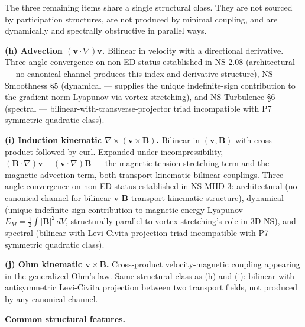 \documentclass[
  11pt,a4paper]{article}
\begin{document}
The three remaining items share a single structural class. They are not
sourced by participation structures, are not produced by minimal
coupling, and are dynamically and spectrally obstructive in parallel
ways.

\textbf{(h) Advection \((\mathbf{v}\cdot\nabla)\mathbf{v}\).} Bilinear
in velocity with a directional derivative. Three-angle convergence on
non-ED status established in NS-2.08 (architectural --- no canonical
channel produces this index-and-derivative structure), NS-Smoothness §5
(dynamical --- supplies the unique indefinite-sign contribution to the
gradient-norm Lyapunov via vortex-stretching), and NS-Turbulence §6
(spectral --- bilinear-with-transverse-projector triad incompatible with
P7 symmetric quadratic class).

\textbf{(i) Induction kinematic
\(\nabla\times(\mathbf{v}\times\mathbf{B})\).} Bilinear in
\((\mathbf{v},\mathbf{B})\) with cross-product followed by curl.
Expanded under incompressibility,
\((\mathbf{B}\cdot\nabla)\mathbf{v} - (\mathbf{v}\cdot\nabla)\mathbf{B}\)
--- the magnetic-tension stretching term and the magnetic advection
term, both transport-kinematic bilinear couplings. Three-angle
convergence on non-ED status established in NS-MHD-3: architectural (no
canonical channel for bilinear \(\mathbf{v}\)-\(\mathbf{B}\)
transport-kinematic structure), dynamical (unique indefinite-sign
contribution to magnetic-energy Lyapunov
\(E_M = \tfrac{1}{2}\int|\mathbf{B}|^2\,dV\), structurally parallel to
vortex-stretching's role in 3D NS), and spectral
(bilinear-with-Levi-Civita-projection triad incompatible with P7
symmetric quadratic class).

\textbf{(j) Ohm kinematic \(\mathbf{v}\times\mathbf{B}\).} Cross-product
velocity-magnetic coupling appearing in the generalized Ohm's law. Same
structural class as (h) and (i): bilinear with antisymmetric Levi-Civita
projection between two transport fields, not produced by any canonical
channel.

\textbf{Common structural features.}
\end{document}
